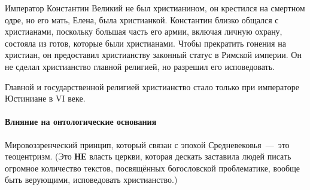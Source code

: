 Император Константин Великий не был христианином, он крестился на смертном одре, но его мать, Елена, была христианкой. Константин близко общался с христианами, поскольку большая часть его армии, включая личную охрану, состояла из готов, которые были христианами. Чтобы прекратить гонения на христиан, он предоставил христианству законный статус в Римской империи. Он не сделал христианство главной религией, но разрешил его исповедовать. 

Главной и государственной религией христианство стало только при императоре Юстиниане в VI веке.

\paragraph{Влияние на онтологические основания}

Мировоззренческий принцип, который связан с эпохой Средневековья~---~это теоцентризм. (Это \textbf{НЕ} власть церкви, которая дескать заставила людей писать огромное количество текстов, посвящённых богословской проблематике, вообще быть верующими, исповедовать христианство.) 



